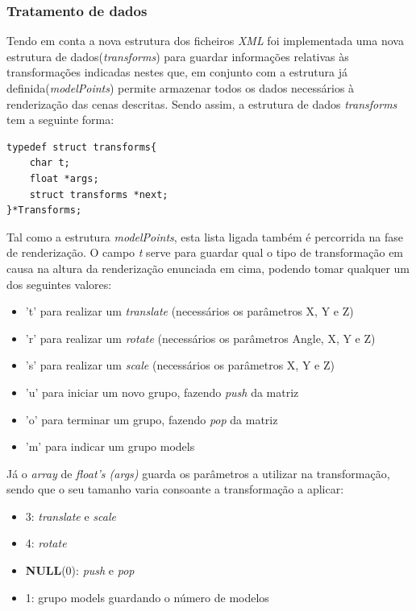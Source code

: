 \documentclass{article}
\begin{document}
\subsubsection{Tratamento de dados}
Tendo em conta a nova estrutura dos ficheiros \textit{XML} foi implementada uma nova estrutura de dados(\textit{transforms}) para guardar informações relativas às transformações indicadas nestes que, em conjunto com a estrutura já definida(\textit{modelPoints}) permite armazenar todos os dados necessários à renderização das cenas descritas.
Sendo assim, a estrutura de dados \textit{transforms} tem a seguinte forma:
\begin{verbatim}
typedef struct transforms{
    char t;
    float *args;
    struct transforms *next;
}*Transforms;
\end{verbatim}
Tal como a estrutura \textit{modelPoints}, esta lista ligada também é percorrida na fase de renderização. O campo \textit{t} serve para guardar qual o tipo de transformação em causa na altura da renderização enunciada em cima, podendo tomar qualquer um dos seguintes valores:
\begin{itemize}
    \item 't' para realizar um \textit{translate} (necessários os parâmetros X, Y e Z)
    \item 'r' para realizar um \textit{rotate} (necessários os parâmetros Angle, X, Y e Z)
    \item 's' para realizar um \textit{scale} (necessários os parâmetros X, Y e Z)
    \item 'u' para iniciar um novo grupo, fazendo \textit{push} da matriz
    \item 'o' para terminar um grupo, fazendo \textit{pop} da matriz
    \item 'm' para indicar um grupo models
\end{itemize}
Já o \textit{array} de \textit{float's (args)} guarda os parâmetros a utilizar na transformação, sendo que o seu tamanho varia consoante a transformação a aplicar:
\begin{itemize}
    \item 3: \textit{translate} e \textit{scale}
    \item 4: \textit{rotate}
    \item \textbf{NULL}(0): \textit{push} e \textit{pop}
    \item 1: grupo models guardando o número de modelos
\end{itemize}
\end{document}
